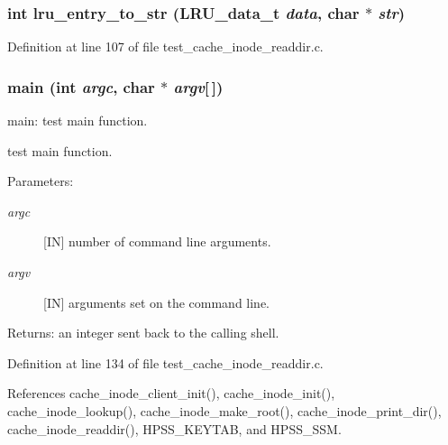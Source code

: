 \subsubsection{\setlength{\rightskip}{0pt plus 5cm}int lru\_\-entry\_\-to\_\-str (LRU\_\-data\_\-t {\em data}, char $\ast$ {\em str})}\label{test__cache__inode__readdir_8c_a2}




Definition at line 107 of file test\_\-cache\_\-inode\_\-readdir.c.
\subsubsection{\setlength{\rightskip}{0pt plus 5cm}main (int {\em argc}, char $\ast$ {\em argv}[$\,$])}\label{test__cache__inode__readdir_8c_a4}


main: test main function.

test main function.

\begin{Desc}
\item[Parameters:]
\begin{description}
\item[{\em argc}][IN] number of command line arguments. \item[{\em argv}][IN] arguments set on the command line.\end{description}
\end{Desc}
\begin{Desc}
\item[Returns:]an integer sent back to the calling shell. \end{Desc}


Definition at line 134 of file test\_\-cache\_\-inode\_\-readdir.c.

References cache\_\-inode\_\-client\_\-init(), cache\_\-inode\_\-init(), cache\_\-inode\_\-lookup(), cache\_\-inode\_\-make\_\-root(), cache\_\-inode\_\-print\_\-dir(), cache\_\-inode\_\-readdir(), HPSS\_\-KEYTAB, and HPSS\_\-SSM.